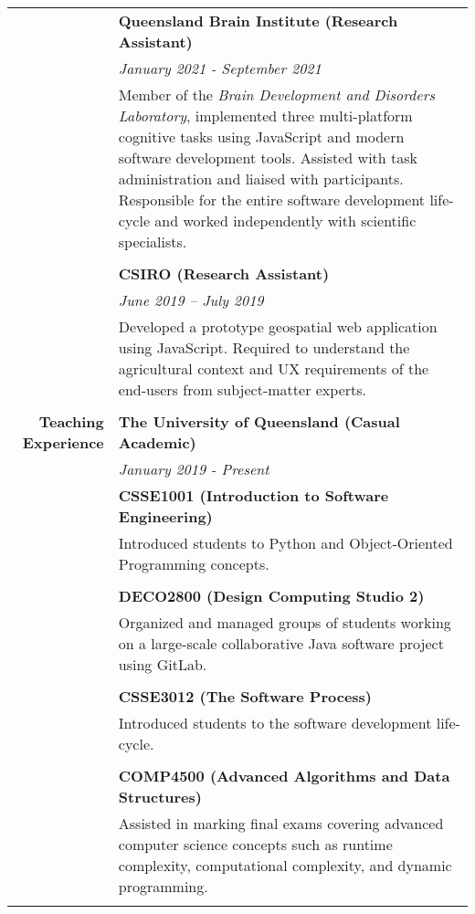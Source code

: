 \documentclass{article}
\begin{document}
\begin{longtable}{r | p{13cm}}
											& \large\textbf{Queensland Brain Institute (Research Assistant)} \\
											& \textit{January 2021 - September 2021} \\
											& Member of the \textit{Brain Development and Disorders Laboratory}, implemented three multi-platform cognitive tasks using JavaScript and modern software development tools. Assisted with task administration and liaised with participants. Responsible for the entire software development life-cycle and worked independently with scientific specialists. \\ 
											& \\

											& \large\textbf{CSIRO (Research Assistant)} \\
	 										& \textit{June 2019 – July 2019} \\
	 										& Developed a prototype geospatial web application using JavaScript. Required to understand the agricultural context and UX requirements of the end-users from subject-matter experts. \\
	 										& \\

		\large\textbf{Teaching Experience}	& \large\textbf{The University of Queensland (Casual Academic)} \\
											& \textit{January 2019 - Present} \\
											& \textbf{CSSE1001 (Introduction to Software Engineering)} \\
											& Introduced students to Python and Object-Oriented Programming concepts. \\
											& \\

											& \textbf{DECO2800 (Design Computing Studio 2)} \\
											& Organized and managed groups of students working on a large-scale collaborative Java software project using GitLab. \\
											& \\

											& \textbf{CSSE3012 (The Software Process)} \\
											& Introduced students to the software development life-cycle. \\
											& \\

											& \textbf{COMP4500 (Advanced Algorithms and Data Structures)} \\
											& Assisted in marking final exams covering advanced computer science concepts such as runtime complexity, computational complexity, and dynamic programming. \\
											& \\


\end{longtable}
\end{document}
